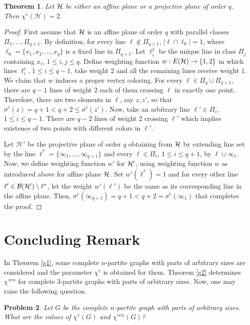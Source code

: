 \documentclass[12pt,a4paper]{article}
\newtheorem{theorem}{\bf Theorem}[section]
\newtheorem{problem}[theorem]{Problem}
\begin{document}
\begin{theorem}\label{plane}
	Let  $ \cal H $ be either an affine plane or a projective plane of order $ q $. Then $ \chi^e(\mathcal{H})=2 $.
\end{theorem}
\begin{proof}
	First assume that $ \cal H $ is an affine plane of order $ q $ with parallel classes $ \Pi_1,\ldots,\Pi_{q+1} $.
	By definition, for every line $ \ell\not\in \Pi_{q+1} $, $ |\ell\cap \ell_0|=1 $, where $ \ell_0=\{x_1,x_2,\ldots, x_q\} $ is a fixed line in $ \Pi_{q+1} $.
	Let $ \ell_i^j $ be the unique line in class $ \Pi_j $ containing $ x_i $, $ 1\leq i,j\leq q $.
	Define weighting function $ w:E({\cal H})\rightarrow\{1,2\} $  in which lines $ \ell_i^i $,  $ 1\leq i\leq q-1 $, take weight $ 2 $ and  all the remaining lines receive weight $ 1 $. 
	We claim that $ w $ induces a proper vertex coloring.  For every $ \ell\in \Pi_{q}\cup\Pi_{q+1} $, there are $ q-1 $ lines of weight $ 2 $ each of them crossing $ \ell$ in exactly one point. Therefore, there are two elements in $ \ell$, say $ z,z' $, so that
	$ \sigma^{e}(z)=q+1<q+2 \leq \sigma ^{e}(z') $.
	Now, take an arbitrary line $ \ell'\in \Pi_{i} $, $ 1\leq i\leq q-1 $. There are $ q-2 $ lines of weight $ 2 $ crossing $ \ell' $ which implies existence of two points with different colors in $ \ell' $.
	
	Let $ \mathcal {H}' $ be the projective plane of order $ q $ obtaining from $ \cal H $ by extending line set by the line $ \ell^*=\{\infty_{1}, \ldots, \infty_{q+1}\} $ and every $ \ell\in \Pi_i $, $ 1\leq i\leq q+1 $, by $ \ell\cup{\infty_{i}} $.
	Now,  we define weighting function $ w' $ for $ \cal H' $, using weighting function $ w $ as introduced above for affine plane $ \cal H $. Set $ w'(\ell^*)=1 $ and for every other line $ \ell'\in{\cal B(H')}\setminus \ell^* $, let the weight $ w'(\ell') $ be the same as its corresponding line in the affine plane. Then, $ \sigma ^{e}(\infty_{q+1})=q+1< q+2=\sigma ^{e}(\infty_{1}) $ that completes the proof.
\end{proof}

\section{Concluding Remark}

In Theorem \ref{g1}, some complete $n$-partite  graphs with parts of arbitrary sizes are considered and  the parameter $\chi^{e}$ is obtained    for them.  Theorem \ref{g2} determines $\chi^{ven}$ for complete $3$-partite graphs with parts of arbitrary sizes. Now, one may raise the following question.
\begin{problem}
	Let $ G $ be the complete $n$-partite  graph with parts of arbitrary sizes. What are the values of  $ \chi^{e}(G) $ and $ \chi^{ven}(G) $?
\end{problem}
\end{document}
